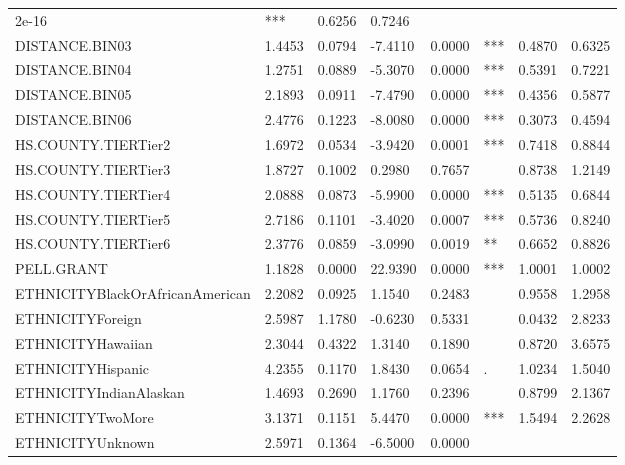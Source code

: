 \documentclass[12pt,english]{report}
\begin{document}
\begin{table}[]
\begin{adjustbox}{width=1.05\textwidth}
\begin{tabular}{llllllll}
2e-16     & ***         & 0.6256 & 0.7246 \\
DISTANCE.BIN03                  & 1.4453   & 0.0794     & -7.4110 & 0.0000     
& ***         & 0.4870 & 0.6325 \\
DISTANCE.BIN04                  & 1.2751   & 0.0889     & -5.3070 & 0.0000     
& ***         & 0.5391 & 0.7221 \\
DISTANCE.BIN05                  & 2.1893   & 0.0911     & -7.4790 & 0.0000     
& ***         & 0.4356 & 0.5877 \\
DISTANCE.BIN06                  & 2.4776   & 0.1223     & -8.0080 & 0.0000     
& ***         & 0.3073 & 0.4594 \\
HS.COUNTY.TIERTier2             & 1.6972   & 0.0534     & -3.9420 & 0.0001     
& ***         & 0.7418 & 0.8844 \\
HS.COUNTY.TIERTier3             & 1.8727   & 0.1002     & 0.2980  & 0.7657     
&             & 0.8738 & 1.2149 \\
HS.COUNTY.TIERTier4             & 2.0888   & 0.0873     & -5.9900 & 0.0000     
& ***         & 0.5135 & 0.6844 \\
HS.COUNTY.TIERTier5             & 2.7186   & 0.1101     & -3.4020 & 0.0007     
& ***         & 0.5736 & 0.8240 \\
HS.COUNTY.TIERTier6             & 2.3776   & 0.0859     & -3.0990 & 0.0019     
& **          & 0.6652 & 0.8826 \\
PELL.GRANT     & 1.1828   & 0.0000     & 22.9390 & 0.0000     & ***
& 1.0001 & 1.0002 \\
ETHNICITYBlackOrAfricanAmerican & 2.2082   & 0.0925     & 1.1540  & 0.2483     
&             & 0.9558 & 1.2958 \\
ETHNICITYForeign                & 2.5987   & 1.1780     & -0.6230 & 0.5331     
&             & 0.0432 & 2.8233 \\
ETHNICITYHawaiian               & 2.3044   & 0.4322     & 1.3140  & 0.1890     
&             & 0.8720 & 3.6575 \\
ETHNICITYHispanic               & 4.2355   & 0.1170     & 1.8430  & 0.0654     
& .           & 1.0234 & 1.5040 \\
ETHNICITYIndianAlaskan          & 1.4693   & 0.2690     & 1.1760  & 0.2396     
&             & 0.8799 & 2.1367 \\
ETHNICITYTwoMore                & 3.1371   & 0.1151     & 5.4470  & 0.0000     
& ***         & 1.5494 & 2.2628 \\
ETHNICITYUnknown                & 2.5971   & 0.1364     & -6.5000 & 0.0000     

\end{tabular}
\end{adjustbox}
\end{table}
\end{document}
